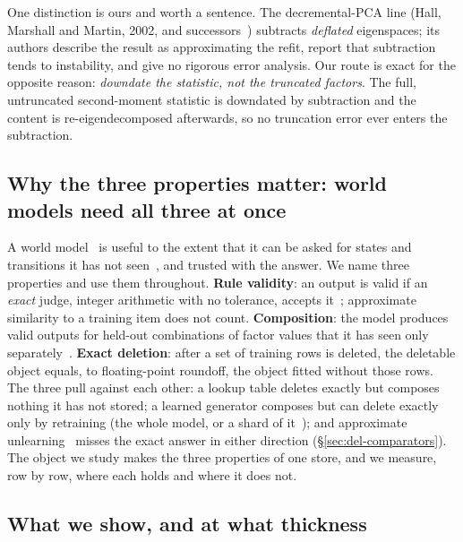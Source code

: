 \documentclass{article} %
\begin{document}
One distinction is ours and worth a sentence. The decremental-PCA line
(Hall, Marshall and Martin, 2002\nocite{hall2002adding}, and successors~\citep{jin2014evd,lee2021fast}) subtracts \emph{deflated} eigenspaces; its
authors describe the result as approximating the refit, report that subtraction tends to
instability, and give no rigorous error analysis. Our route is exact for the opposite reason:
\emph{downdate the statistic, not the truncated factors}. The full, untruncated second-moment
statistic is downdated by subtraction and the content is re-eigendecomposed afterwards, so no
truncation error ever enters the subtraction.

\subsection{Why the three properties matter: world models need all three at once}
\label{sec:why}

A world model~\citep{ha2018world,hafner2025mastering} is useful to the extent that it can be asked for states and transitions it
has not seen~\citep{valevski2025diffusion}, and trusted with the answer. We name three properties and use them throughout.
\textbf{Rule validity}: an output is valid if an \emph{exact} judge, integer arithmetic with
no tolerance, accepts it~\citep{vafa2024evaluating}; approximate similarity to a training item does not count.
\textbf{Composition}: the model produces valid outputs for held-out combinations of factor
values that it has seen only separately~\citep{zhao2022toward}. \textbf{Exact deletion}: after a set of training rows
is deleted, the deletable object equals, to floating-point roundoff, the object fitted without
those rows. The three pull against each other: a lookup table deletes exactly but composes
nothing it has not stored; a learned generator composes but can delete exactly only by retraining
(the whole model, or a shard of it~\citep{bourtoule2021machine}); and
approximate unlearning~\citep{guo2020certified,golatkar2020eternal} misses the exact answer in either direction (\S\ref{sec:del-comparators}).
The object we study makes the three properties of one store, and we measure, row by row, where each
holds and where it does not.

\subsection{What we show, and at what thickness}
\label{sec:contrib}
\end{document}
